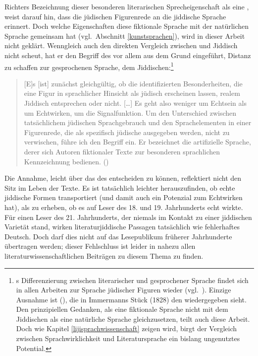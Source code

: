 Richters Bezeichnung dieser besonderen literarischen Sprech\-eigen\-schaft als eine , weist darauf hin, dass die jüdischen Figurenrede an die jiddische Sprache erinnert. Doch welche Eigenschaften diese fiktionale Sprache mit der natürlichen Sprache gemeinsam hat (vgl.\, Abschnitt \ref{kunstsprachen}), wird in dieser Arbeit nicht geklärt.  Wenngleich auch \cite{Richter1995} den direkten Vergleich zwischen \hai{{\LiJi}} und Jiddisch nicht scheut, hat er den Begriff des \hai{{\LiJi}} vor allem aus dem Grund eingeführt, Distanz zu schaffen zur gesprochenen Sprache, dem Jiddischen:\footnote{\citeauthor{Richter1995}s Differenzierung zwischen literarischer und gesprochener Sprache findet sich in allen Arbeiten zur Sprache jüdischer Figuren wieder (vgl.\, \citealt{FischerBayerd2008,Althaus1981,Althaus1986,Gelber1986,Glasenapp1999,Och1995,Krobb2000,Denkler1977,Gubser1998,Schreuder2002,Groezinger1998}). Einzige Ausnahme ist \citeauthor{Frenzel1942} (\citealt[105]{Frenzel1942}), die in Immermanns Stück  (1828) den  wiedergegeben sieht. Den prinzipiellen Gedanken, \hai{{\LiJi}} als eine fiktionale Sprache nicht mit dem Jiddischen als eine natürliche Sprache gleichzusetzen, teilt auch diese Arbeit. Doch wie Kapitel \ref{lijisprachwissenschaft} zeigen wird, birgt der Vergleich zwischen Sprachwirklichkeit und Literatursprache ein bislang ungenutztes Potential.}

\begin{quote}
[E]s [ist] zunächst gleichgültig, ob die identifizierten Besonderheiten, die eine Figur in sprachlicher Hinsicht als jüdisch erscheinen lassen, realem Jiddisch entsprechen oder nicht. […] Es geht also weniger um Echtsein als um Echtwirken, um die Signalfunktion. Um den Unterschied zwischen tatsächlichem jüdischen Sprachgebrauch und den Sprachelementen in einer Figurenrede, die als spezifisch jüdische ausgegeben werden, nicht zu verwischen, führe ich den Begriff  ein. Er bezeichnet die artifizielle Sprache, derer sich Autoren fiktionaler Texte zur besonderen 
sprachlichen Kennzeichnung bedienen. (\citealt[11,\,12]{Richter1995})
\end{quote}
 
Die Annahme, leicht über das  des \hai{{\LiJi}} entscheiden zu können, reflektiert nicht den Sitz im Leben der Texte. Es ist tatsächlich leichter herauszufinden, ob \hai{{\LiJi}} echte jiddische Formen transportiert (und damit auch ein Potenzial zum Echtwirken hat), als zu erheben, ob es auf Leser des 18. und 19. Jahrhunderts echt wirkte. Für einen Leser des 21. Jahrhunderts, der niemals im Kontakt zu einer jiddischen Varietät stand, wirken literaturjiddische Passagen tatsächlich wie fehlerhaftes Deutsch. Doch darf dies nicht auf das Lesepublikum früherer Jahrhunderte übertragen werden; dieser Fehlschluss ist leider in nahezu allen  literaturwissenschaftlichen Beiträgen zu diesem Thema zu finden. 

